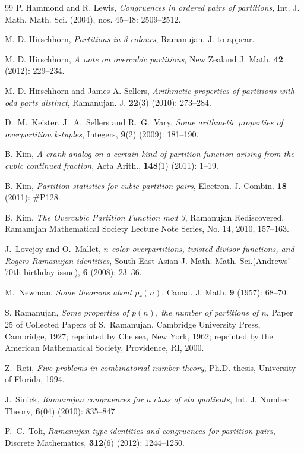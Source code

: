 \documentclass[12pt]{amsart}
\numberwithin{equation}{section}
\theoremstyle{plain}
\theoremstyle{definition}
\begin{document}
\begin{thebibliography}{99}
P. Hammond and R. Lewis, \emph{Congruences in ordered pairs of partitions}, Int. J. Math. Math. Sci. (2004), nos. 45--48: 2509--2512.

M. D. Hirschhorn, \emph{Partitions in 3 colours}, Ramanujan. J. to appear.

M. D. Hirschhorn, \emph{A note on overcubic partitions}, New Zealand J. Math. {\bf 42} (2012): 229--234.

M. D. Hirschhorn and James A. Sellers, \emph{Arithmetic properties of partitions with odd parts distinct}, Ramanujan. J. \textbf{22}(3) (2010): 273--284.

D.~M.~Keister, J.~A.~Sellers and R.~G.~Vary, \emph{Some arithmetic properties of overpartition k-tuples}, Integers, {\bf 9}(2) (2009): 181--190.

B. Kim, \emph{A crank analog on a certain kind of partition function arising from the cubic continued fraction},  Acta Arith., \textbf{148}(1) (2011): 1--19.

B. Kim, \emph{Partition statistics for cubic partition pairs}, Electron. J. Combin. \textbf{18} (2011): \#P128.

B. Kim, \emph{The Overcubic Partition Function mod 3}, Ramanujan Rediscovered, Ramanujan Mathematical Society Lecture Note Series, No. 14, 2010, 157--163.

J.~Lovejoy and O.~Mallet, \emph{$n$-color overpartitions, twisted divisor functions, and Rogers-Ramanujan identities}, South East Asian J. Math. Math. Sci.(Andrews' 70th birthday issue), {\bf 6} (2008): 23--36.

M.~Newman, \emph{Some theorems about $p_r (n)$}, Canad. J. Math, {\bf 9} (1957): 68--70.

S. Ramanujan, \emph{Some properties of $p(n)$, the number of partitions of $n$}, Paper 25 of Collected Papers of S.~Ramanujan, Cambridge University Press, Cambridge, 1927; reprinted by Chelsea, New York, 1962; reprinted by the American Mathematical Society, Providence, RI, 2000.

Z.~Reti, \emph{Five problems in combinatorial number theory}, Ph.D. thesis, University of Florida, 1994.

J.~Sinick, \emph{Ramanujan congruences for a class of eta quotients}, Int. J. Number Theory, {\bf 6}(04) (2010): 835--847.

P.~C.~Toh, \emph{Ramanujan type identities and congruences for partition pairs}, Discrete Mathematics, {\bf 312}(6) (2012): 1244--1250.


\end{thebibliography}
\end{document}
